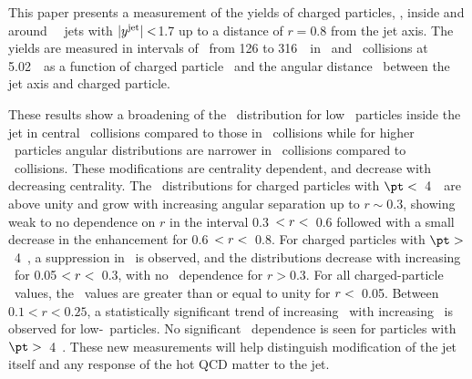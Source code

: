
This paper presents a measurement of the yields of charged particles, \Dptr, inside and around \RFour\ \antikt\ jets with $|\mbox{$y^{\mathrm{jet}}$}| <$1.7 up to a distance of $r = 0.8$ from the jet axis. The yields are measured in intervals of \ptjet\ from 126 to 316~\GeV\ in \PbPb\ and \pp\ collisions at 5.02~\TeV\ as a function of charged particle \pt\ and the angular distance \rvar\ between the jet axis and charged particle.


These results show a broadening of the \Dptr\ distribution for low \pt\ particles inside the jet
in central \pbpb\ collisions compared to those in \pp\ collisions while for higher \pt\ particles
angular distributions are narrower in \pbpb\ collisions compared to \pp\ collisions.
These modifications are centrality dependent, and decrease with decreasing centrality. 
The \RDptr\ distributions for charged particles with $\pt <$~4~\GeV\ 
are above unity and 
grow with increasing angular separation up to $r \sim0.3$, showing weak to no dependence on $r$ in the interval 0.3~$< \mbox{$r$} <$~0.6 followed with a small decrease in the enhancement for 0.6~$< \mbox{$r$} <$~0.8.
For charged particles with $\pt >$~4~\GeV, a suppression in \RDptr\ is observed, and the 
distributions decrease with increasing
\rvar\ for 0.05 $ < \mbox{$r$} < $~0.3, with no \rvar\ dependence for $r>0.3$. 
For all charged-particle \pt\ values, the \RDptr\ values are greater than or equal to unity for
$\mbox{$r$} <$~0.05.
Between $0.1 < r < 0.25$, a statistically significant trend of increasing \RDptr\ with increasing \ptjet\ is observed for low-\pt\ particles. No significant \ptjet\ dependence is seen for particles  with $\pt >$~4~\GeV.
These new measurements will help distinguish modification of the jet itself
and any response of the hot QCD matter to the jet.



